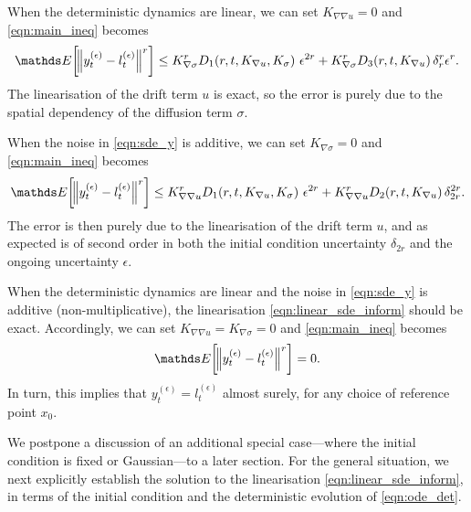 \begin{remark}\label{rem:bound_linear}
	When the deterministic dynamics are linear, we can set \(K_{\nabla\nabla u} = 0\) and \cref{eqn:main_ineq} becomes
	\[
		\avg{\norm{y_t^{(\epsilon)} - l_t^{(\epsilon)}}^r} \leq   K_{\nabla\sigma}^r D_1\!\left(r, t, K_{\nabla u}, K_\sigma\right)\, \epsilon^{2r} + K_{\nabla\sigma}^r D_3\!\left(r,t, K_{\nabla u}\right)\delta_r^r \epsilon^r.
	\]
	The linearisation of the drift term \(u\) is exact, so the error is purely due to the spatial dependency of the diffusion term \(\sigma\).
\end{remark}

\begin{remark}\label{rem:bound_additive}
	When the noise in \cref{eqn:sde_y} is additive, we can set \(K_{\nabla\sigma} = 0\) and \cref{eqn:main_ineq} becomes
	\[
		\avg{\norm{y_t^{(\epsilon)} - l_t^{(\epsilon)}}^r} \leq   K_{\nabla\nabla u}^r D_1\!\left(r,t, K_{\nabla u}, K_\sigma\right)\, \epsilon^{2r} + K_{\nabla\nabla u}^r D_2\!\left(r,t, K_{\nabla u}\right)\delta_{2r}^{2r}.
	\]
	The error is then purely due to the linearisation of the drift term \(u\), and as expected is of second order in both the initial condition uncertainty \(\delta_{2r}\) and the ongoing uncertainty \(\epsilon\).
\end{remark}

\begin{remark}\label{rem:bound_exact}
	When the deterministic dynamics are linear and the noise in \cref{eqn:sde_y} is additive (non-multiplicative), the linearisation \cref{eqn:linear_sde_inform} should be exact.
	Accordingly, we can set \(K_{\nabla\nabla u} = K_{\nabla\sigma} = 0\) and \cref{eqn:main_ineq} becomes
	\[
		\avg{\norm{y_t^{(\epsilon)} - l_t^{(\epsilon)}}^r} = 0.
	\]
	In turn, this implies that \(y_t^{(\epsilon)} = l_t^{(\epsilon)}\) almost surely, for any choice of reference point \(x_0\).
\end{remark}


We postpone a discussion of an additional special case---where the initial condition is fixed or Gaussian---to a later section.
For the general situation, we next explicitly establish the solution to the linearisation \cref{eqn:linear_sde_inform}, in terms of the initial condition and the deterministic evolution of \cref{eqn:ode_det}.

